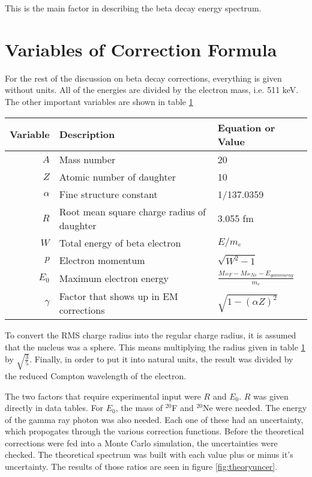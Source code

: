 This is the main factor in describing the beta decay energy spectrum.

\section{Variables of Correction Formula}

For the rest of the discussion on beta decay corrections, everything is given without units.
All of the energies are divided by the electron mass, i.e. 511 keV.
The other important variables are shown in table \ref{tab:vars}

\begin{table}[!hbt]
	\centering
		\begin{tabular}{r|l|l}
		Variable & Description & Equation or Value \\ \hline		
		$A$ & Mass number & 20 \\ 
		$Z$ & Atomic number of daughter & 10 \\
		$\alpha$ & Fine structure constant & 1/137.0359\\
		$R$ & Root mean square charge radius of daughter & 3.055 fm \cite{Ang13} \\
		$W$ & Total energy of beta electron & $E/m_{e}$ \\
		$p$ & Electron momentum & $\sqrt{W^{2} - 1}$ \\
		$E_{0}$ & Maximum electron energy & $\frac{M_{^{20}F} - M_{^{20}Ne} - E_{gamma ray}}{m_{e}}$ \\
		$\gamma$ & Factor that shows up in EM corrections& $\sqrt{1 - (\alpha Z)^{2}}$ 
		\label{tab:vars}
		\end{tabular}
\end{table}

To convert the RMS charge radius into the regular charge radius, it is assumed that the nucleus was a sphere. 
This means multiplying the radius given in table \ref{tab:vars} by $\sqrt{\frac{3}{5}}$.
Finally, in order to put it into natural units, the result was divided by the reduced Compton wavelength of the electron.

The two factors that require experimental input were $R$ and $E_{0}$. 
$R$ was given directly in data tables.
For $E_{0}$, the mass of $^{20}$F and $^{20}$Ne were needed.
The energy of the gamma ray photon was also needed.
Each one of these had an uncertainty, which propogates through the various correction functions.
Before the theoretical corrections were fed into a Monte Carlo simulation, the uncertainties were checked.
The theoretical spectrum was built with each value plus or minus it's uncertainty.
The results of those ratios are seen in figure \ref{fig:theoryuncer}.

